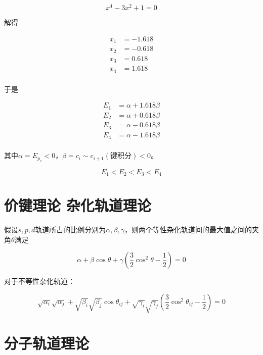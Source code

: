 \begin{equation*}
	x^4 - 3x^2 + 1 = 0
\end{equation*}

解得

\begin{align*}
	x_1 & = -1.618 \\
	x_2 & = -0.618 \\
	x_3 & = 0.618  \\
	x_4 & = 1.618  \\
\end{align*}

于是

\begin{align*}
	E_1 & = \alpha + 1.618\beta \\
	E_2 & = \alpha + 0.618\beta \\
	E_3 & = \alpha - 0.618\beta \\
	E_4 & = \alpha - 1.618\beta \\
\end{align*}

其中$\alpha = E_{p_z} < 0$，$\beta = c_i \sim c_{i+1} (\mbox{键积分}) < 0$。


\begin{equation*}
	E_1 < E_2 < E_3 < E_4
\end{equation*}

\section{价键理论 杂化轨道理论}

假设$s,p,d$轨道所占的比例分别为$\alpha, \beta, \gamma$，则两个等性杂化轨道间的最大值之间的夹角$\theta$满足





\begin{equation*}
	\alpha + \beta \cos \theta + \gamma \left(\frac{3}{2}\cos ^2 \theta - \frac{1}{2}\right) = 0
\end{equation*}

对于不等性杂化轨道：

\begin{equation*}
	\sqrt{\alpha_i} \sqrt{\alpha_j} + \sqrt{\beta_i}{\sqrt{\beta_j}} \cos \theta_{ij} + \sqrt{\gamma_i}\sqrt{\gamma_j} \left( \frac{3}{2} \cos ^2 \theta_{ij} - \frac{1}{2}  \right)= 0
\end{equation*}

\section{分子轨道理论}


